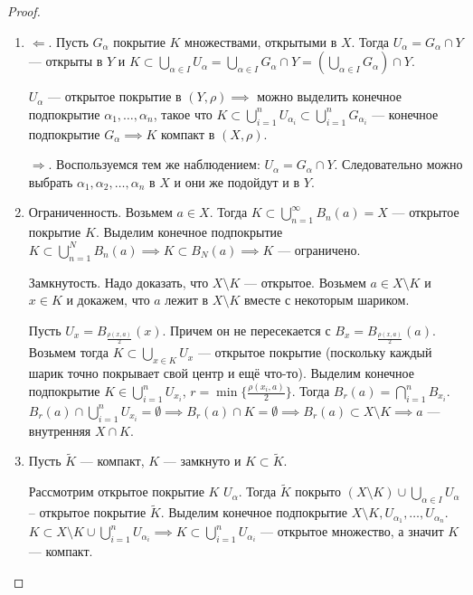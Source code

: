 \begin{proof}
    \begin{enumerate}
        \item $\Leftarrow$. Пусть  $G_\alpha$ покрытие  $K$ множествами, открытыми в $X$. Тогда  $U_\alpha = G_\alpha \cap Y$ --- открыты в  $Y$ и $K \subset \bigcup_{\alpha \in I} U_\alpha = \bigcup_{\alpha \in I} G_\alpha \cap Y = (\bigcup_{\alpha \in I} G_\alpha) \cap Y$.

             $U_\alpha$ --- открытое покрытие в  $(Y, \rho) \implies$ можно выделить конечное подпокрытие  $\alpha_1, \ldots, \alpha_n$, такое что $K \subset \bigcup\limits_{i=1}^n U_{\alpha_i} \subset \bigcup\limits_{i=1}^n G_{\alpha_i}$ --- конечное подпокрытие $G_\alpha \implies K$ компакт в  $(X, \rho)$.

              $\Rightarrow$. Воспользуемся тем же наблюдением: $U_\alpha = G_\alpha \cap Y$. Следовательно можно выбрать  $\alpha_1, \alpha_2, \ldots, \alpha_n$ в $X$ и они же подойдут и в  $Y$. 
          \item Ограниченность. Возьмем $a \in X$. Тогда  $K \subset \bigcup\limits_{n=1}^\infty B_n(a) = X$ --- открытое покрытие  $K$. Выделим конечное подпокрытие  $K \subset \bigcup\limits_{n=1}^N B_n(a) \implies K \subset B_N(a) \implies K$ --- ограничено. 

              Замкнутость. Надо доказать, что $X \setminus K$ --- открытое. Возьмем  $a \in X \setminus K$ и $x \in K$ и докажем, что  $a$ лежит в  $X \setminus K$ вместе с некоторым шариком.

              Пусть  $U_x = B_{\frac{\rho(x, a)}{2}}(x)$. Причем он не пересекается с $B_x = B_{\frac{\rho(x, a)}{2}}(a)$. Возьмем тогда $K \subset \bigcup_{x \in K} U_x$ --- открытое покрытие (поскольку каждый шарик точно покрывает свой центр и ещё что-то). Выделим конечное подпокрытие  $K \in \bigcup\limits_{i=1}^n U_{x_i}$,  $r = \min\{\frac{\rho(x_i, a)}{2} \}$. Тогда $B_r(a) = \bigcap\limits_{i=1}^n B_{x_i}$.  $B_r(a) \cap \bigcup\limits_{i=1}^n U_{x_i} = \emptyset \implies B_r(a) \cap K = \emptyset \implies B_r(a) \subset X \setminus K \implies a$ --- внутренняя $X \cap K$.
          \item Пусть $\widetilde{K}$ --- компакт,  $K$ --- замкнуто и  $K \subset \widetilde{K}$.

              Рассмотрим открытое покрытие  $K$  $U_\alpha$. Тогда  $\widetilde{K}$ покрыто  $(X \setminus K) \cup \bigcup\limits_{\alpha \in I} U_\alpha$ -- открытое покрытие  $\widetilde{K}$. Выделим конечное подпокрытие  $X \setminus K, U_{\alpha_1}, \ldots, U_{\alpha_n}$. $K \subset X \setminus K \cup \bigcup\limits_{i=1}^n U_{\alpha_i} \implies K \subset \bigcup\limits_{i=1}^n U_{\alpha_i}$ --- открытое множество, а значит  $K$ --- компакт.
    \end{enumerate}
\end{proof}
